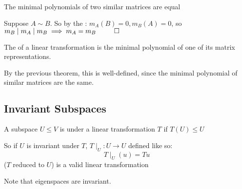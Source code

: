 \documentclass[10pt]{article}
\begin{document}
\begin{theorem}{The minimal polynomials of two similar matrices are equal}

Suppose $A\sim B$. So by the : $m_A(B)=0, m_B(A)=0$, so $m_B\mid m_A \mid m_B \implies m_A=m_B~~\qed$

\end{theorem}

\begin{definition}

The  of a linear transformation is the minimal polynomial of one of its matrix representations.

\end{definition}

By the previous theorem, this is well-defined, since the minimal polynomial of similar matrices are the same.

\newpage
\subsection{Invariant Subspaces}

\begin{definition*}

A subspace $U\leq V$ is  under a linear transformation $T$ if $T(U)\leq U$

\end{definition*}

\noindent So if $U$ is invariant under $T$, $T\mid_U:U\to U$ defined like so:
\[ T\mid_U(u) = Tu \]
($T$ reduced to $U$) is a valid linear transformation

Note that eigenspaces are invariant.
\end{document}

